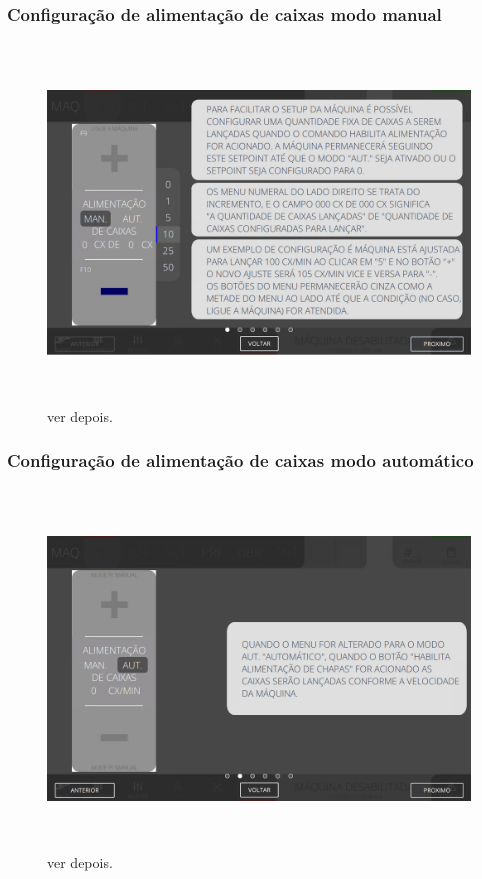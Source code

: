 \subsubsection{\small{Configuração de alimentação de caixas modo manual}}
\begin{figure}[h]
  \centering
  \includegraphics[width=576px,height=360px]{src/images/03-feeder/commands/e-1.png}
  \caption{ver depois.}
   \label{}
\end{figure}
\vspace*{\fill}


\newpage
\thispagestyle{fancy}
\vspace*{\fill}
\subsubsection{\small{Configuração de alimentação de caixas modo automático}}
\begin{figure}[h]
  \centering
  \includegraphics[width=576px,height=360px]{src/images/03-feeder/commands/e-2.png}
  \caption{ver depois.}
   \label{}
\end{figure}
\vspace*{\fill}

